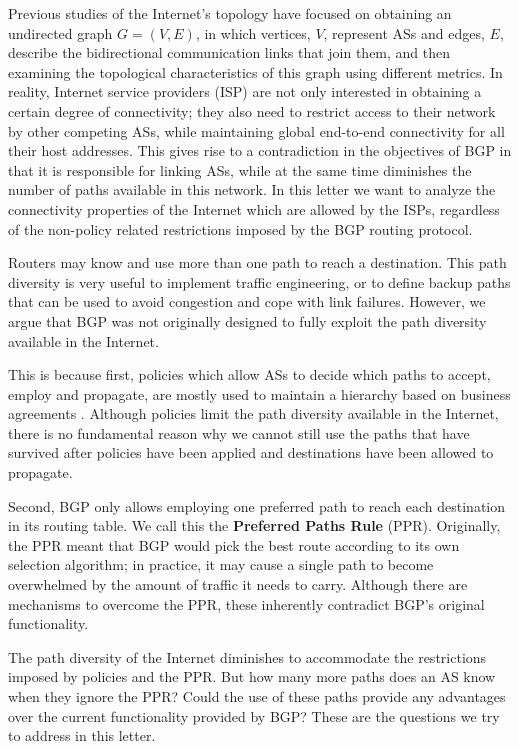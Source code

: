 \documentclass[10pt,final,journal]{IEEEtran}
\begin{document}
Previous studies of the Internet's topology \cite{Mahadevan2006} have focused on obtaining an undirected graph $G=\left(V,E\right)$, in which vertices, $V$, represent ASs and edges, $E$, describe the bidirectional communication links that join them, and then examining the topological characteristics of this graph using different metrics. In reality, Internet service providers (ISP) are not only interested in obtaining a certain degree of connectivity; they also need to restrict access to their network by other competing ASs, while maintaining global end-to-end connectivity for all their host addresses. This gives rise to a contradiction in the objectives of BGP in that it is responsible for linking ASs, while at the same time diminishes the number of paths available in this network. In this letter we want to analyze the connectivity properties of the Internet which are allowed by the ISPs, regardless of the non-policy related restrictions imposed by the BGP routing protocol.

Routers may know and use more than one path to reach a destination. This path diversity is very useful to implement traffic engineering, or to define backup paths that can be used to avoid congestion and cope with link failures. However, we argue that BGP was not originally designed to fully exploit the path diversity available in the Internet.

This is because first, policies which allow ASs to decide which paths to accept, employ and propagate, are mostly used to maintain a hierarchy based on business agreements \cite{Gao2000a}. Although policies limit the path diversity available in the Internet, there is no fundamental reason why we cannot still use the paths that have survived after policies have been applied and destinations have been allowed to propagate.

Second, BGP only allows employing one preferred path to reach each destination in its routing table. We call this the \textbf{Preferred Paths Rule} (PPR). Originally, the PPR meant that BGP would pick the best route according to its own selection algorithm; in practice, it may cause a single path to become overwhelmed by the amount of traffic it needs to carry. Although there are mechanisms to overcome the PPR, these inherently contradict BGP's original functionality.

The path diversity of the Internet diminishes to accommodate the restrictions imposed by policies and the PPR. But how many more paths does an AS know when they ignore the PPR? Could the use of these paths provide any advantages over the current functionality provided by BGP? These are the questions we try to address in this letter.
\end{document}
